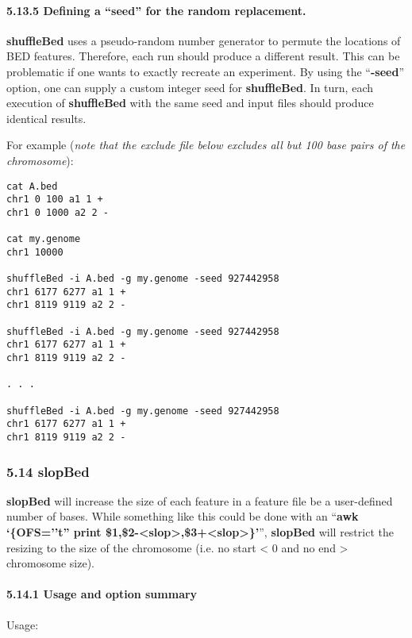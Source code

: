 \documentclass[letterpaper,10pt,english]{sphinxmanual}
\begin{document}
\paragraph{5.13.5 Defining a ``seed'' for the random replacement.}
\label{content/shuffleBed:defining-a-seed-for-the-random-replacement}
\textbf{shuffleBed} uses a pseudo-random number generator to permute the locations of BED features.
Therefore, each run should produce a different result. This can be problematic if one wants to exactly
recreate an experiment. By using the ``\textbf{-seed}'' option, one can supply a custom integer seed for
\textbf{shuffleBed}. In turn, each execution of \textbf{shuffleBed} with the same seed and input files should produce
identical results.

For example (\emph{note that the exclude file below excludes all but 100 base pairs of the chromosome}):

\begin{Verbatim}[commandchars=\\\{\}]
cat A.bed
chr1 0 100 a1 1 +
chr1 0 1000 a2 2 -

cat my.genome
chr1 10000

shuffleBed -i A.bed -g my.genome -seed 927442958
chr1 6177 6277 a1 1 +
chr1 8119 9119 a2 2 -

shuffleBed -i A.bed -g my.genome -seed 927442958
chr1 6177 6277 a1 1 +
chr1 8119 9119 a2 2 -

. . .

shuffleBed -i A.bed -g my.genome -seed 927442958
chr1 6177 6277 a1 1 +
chr1 8119 9119 a2 2 -
\end{Verbatim}


\subsubsection{5.14 slopBed}
\label{content/slopBed:slopbed}\label{content/slopBed::doc}
\textbf{slopBed} will increase the size of each feature in a feature file be a user-defined number of bases. While
something like this could be done with an ``\textbf{awk `\{OFS=''t'' print \$1,\$2-\textless{}slop\textgreater{},\$3+\textless{}slop\textgreater{}\}'}'',
\textbf{slopBed} will restrict the resizing to the size of the chromosome (i.e. no start \textless{} 0 and no end \textgreater{}
chromosome size).


\paragraph{5.14.1 Usage and option summary}
\label{content/slopBed:usage-and-option-summary}
Usage:
\end{document}
